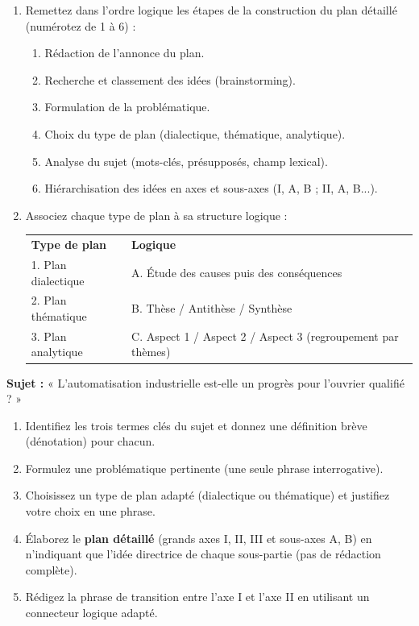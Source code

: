 \documentclass[11pt]{article}
\begin{document}
\begin{exercice}
\begin{enumerate}
    \item Remettez dans l'ordre logique les étapes de la construction du plan détaillé (numérotez de 1 à 6) :
    \begin{enumerate}
        \item Rédaction de l'annonce du plan.
        \item Recherche et classement des idées (brainstorming).
        \item Formulation de la problématique.
        \item Choix du type de plan (dialectique, thématique, analytique).
        \item Analyse du sujet (mots-clés, présupposés, champ lexical).
        \item Hiérarchisation des idées en axes et sous-axes (I, A, B ; II, A, B...).
    \end{enumerate}
    \item Associez chaque type de plan à sa structure logique :
    \begin{tabular}{ll}
    \textbf{Type de plan} & \textbf{Logique} \\
    1. Plan dialectique & A. Étude des causes puis des conséquences \\
    2. Plan thématique & B. Thèse / Antithèse / Synthèse \\
    3. Plan analytique & C. Aspect 1 / Aspect 2 / Aspect 3 (regroupement par thèmes) \\
    \end{tabular}
\end{enumerate}
\end{exercice}

\begin{exercice}
\textbf{Sujet :} « L'automatisation industrielle est-elle un progrès pour l'ouvrier qualifié ? »

\begin{enumerate}
    \item Identifiez les trois termes clés du sujet et donnez une définition brève (dénotation) pour chacun.
    \item Formulez une problématique pertinente (une seule phrase interrogative).
    \item Choisissez un type de plan adapté (dialectique ou thématique) et justifiez votre choix en une phrase.
    \item Élaborez le \textbf{plan détaillé} (grands axes I, II, III et sous-axes A, B) en n'indiquant que l'idée directrice de chaque sous-partie (pas de rédaction complète).
    \item Rédigez la phrase de transition entre l'axe I et l'axe II en utilisant un connecteur logique adapté.
\end{enumerate}
\end{exercice}
\end{document}
